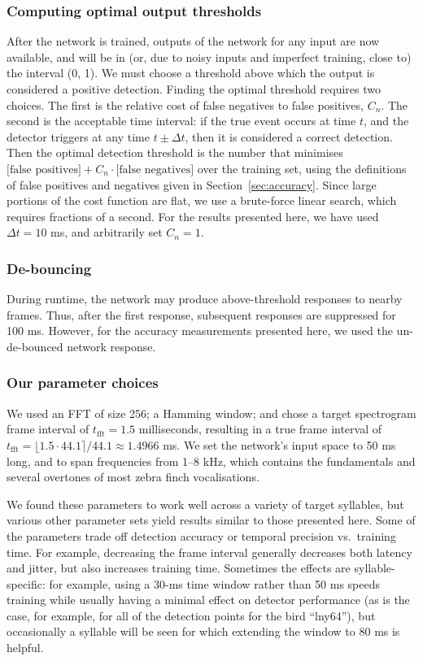 \documentclass[10pt,letterpaper]{article}
\begin{document}
\subsubsection{Computing optimal output thresholds}
\label{sec:optimalthresholds}
After the network is trained, outputs of the network for any input are
now available, and will be in (or, due to noisy inputs and imperfect
training, close to) the interval (0, 1). We must choose a threshold
above which the output is considered a positive detection. Finding the
optimal threshold requires two choices. The first is the relative cost
of false negatives to false positives, $C_n$. The second is the
acceptable time interval: if the true event occurs at time $t$, and
the detector triggers at any time $t\pm\Delta t$, then it is
considered a correct detection. Then the optimal detection threshold
is the number that minimises $\textrm{[false positives]}
+C_n\cdot\textrm{[false negatives]}$ over the training set, using the
definitions of false positives and negatives given in
Section~\ref{sec:accuracy}. Since large portions of the cost function
are flat, we use a brute-force linear search, which requires fractions of a
second. For the results presented here, we have used
$\Delta t=10$ ms, and arbitrarily set $C_n=1$.

\subsubsection{De-bouncing}

During runtime, the network may produce above-threshold responses to
nearby frames.  Thus, after the first response, subsequent responses
are suppressed for 100 ms.  However, for the accuracy measurements
presented here, we used the un-de-bounced network response.

\subsubsection{Our parameter choices}

We used an FFT of size 256; a Hamming window; and chose a target
spectrogram frame interval of $t_\textrm{fft}=1.5$ milliseconds,
resulting in a true frame interval of $t_\textrm{fft}=\lfloor 1.5\cdot
44.1\rceil /44.1\approx 1.4966$ ms.  We set the network's input space
to 50 ms long, and to span frequencies from 1--8 kHz, which contains
the fundamentals and several overtones of most zebra finch
vocalisations.

We found these parameters to work well across a variety of target
syllables, but various other parameter sets yield results similar to
those presented here.  Some of the parameters trade off detection
accuracy or temporal precision vs.~training time. For example,
decreasing the frame interval generally decreases both latency and
jitter, but also increases training time. Sometimes the effects are
syllable-specific: for example, using a 30-ms time window rather than
50 ms speeds training while usually having a minimal effect on
detector performance (as is the case, for example, for all of the
detection points for the bird ``lny64''), but occasionally a syllable will be seen
for which extending the window to 80 ms is helpful.
\end{document}
